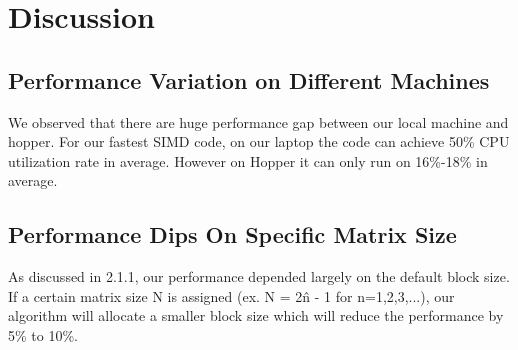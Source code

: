 \documentclass{article}
\begin{document}
\section{Discussion}
\subsection {Performance Variation on Different Machines}
We observed that there are huge performance gap between our local machine and hopper. For our fastest SIMD code, on our laptop the code can achieve 50\% CPU utilization rate in average. However on Hopper it can only run on 16\%-18\% in average.
\subsection {Performance Dips On Specific Matrix Size}
As discussed in 2.1.1, our performance depended largely on the default block size. If a certain matrix size N is assigned (ex. N = 2\^n - 1 for n=1,2,3,...), our algorithm will allocate a smaller block size which will reduce the performance by 5\% to 10\%.


%
%
\end{document}
